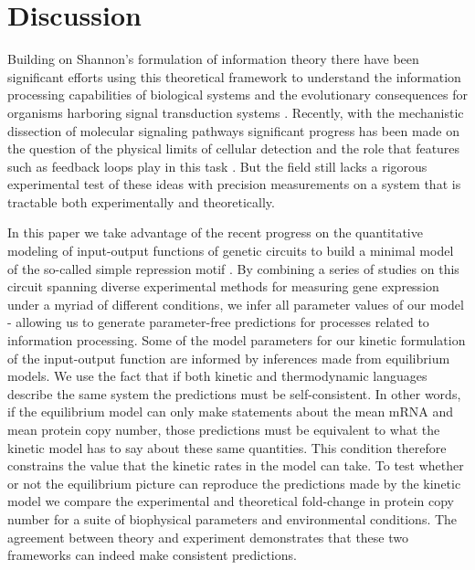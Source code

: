 \section*{Discussion}

Building on Shannon's formulation of information theory there have been
significant efforts using this theoretical framework to understand the
information processing capabilities of biological systems and the evolutionary
consequences for organisms harboring signal transduction systems
\cite{Bergstrom2004, Taylor2007a, Tkacik2008, Polani2009, Nemenman2010,
Rivoire2011}. Recently, with the mechanistic dissection of molecular signaling
pathways significant progress has been made on the question of the physical
limits of cellular detection and the role that features such as feedback loops
play in this task \cite{Bialek2005, Libby2007, Tkacik2011, Rhee2012a,
Voliotis2014a}. But the field still lacks a rigorous experimental test of these
ideas with precision measurements on a system that is tractable both
experimentally and theoretically.

In this paper we take advantage of the recent progress on the quantitative
modeling of input-output functions of genetic circuits to build a minimal model
of the so-called simple repression motif \cite{Phillips2019}. By combining a
series of studies on this circuit spanning diverse experimental methods for
measuring gene expression under a myriad of different conditions, we infer all
parameter values of our model - allowing us to generate parameter-free
predictions for processes related to information processing. Some of the model
parameters for our kinetic formulation of the input-output function are informed
by inferences made from equilibrium models. We use the fact that if both
kinetic and thermodynamic languages describe the same system the predictions
must be self-consistent. In other words, if the equilibrium model can only make
statements about the mean mRNA and mean protein copy number, those predictions
must be equivalent to what the kinetic model has to say about these same
quantities. This condition therefore constrains the value that the kinetic rates
in the model can take. To test whether or not the equilibrium picture can
reproduce the predictions made by the kinetic model we compare the experimental
and theoretical fold-change in protein copy number for a suite of biophysical
parameters and environmental conditions. The agreement between theory and
experiment demonstrates that these two frameworks can indeed make consistent
predictions.

